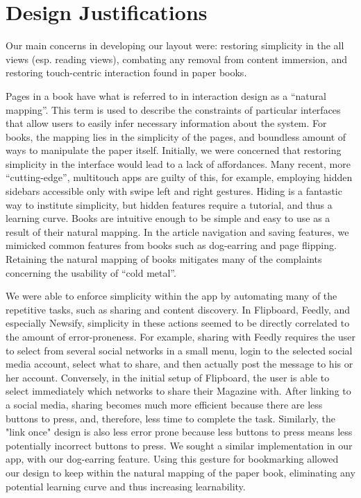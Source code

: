 \documentclass[11pt, oneside]{article}   	%
\begin{document}
\section{Design Justifications}
Our main concerns in developing our layout were: restoring simplicity in the all views (esp. reading views), combating any removal from content immersion, and restoring touch-centric interaction found in paper books.

Pages in a book have what is referred to in interaction design as a ``natural mapping''. This term is used to describe the constraints of particular interfaces that allow users to easily infer necessary information about the system. For books, the mapping lies in the simplicity of the pages, and boundless amount of ways to manipulate the paper itself. Initially, we were concerned that restoring simplicity in the interface would lead to a lack of affordances. Many recent, more ``cutting-edge'', multitouch apps are guilty of this, for example, employing hidden sidebars accessible only with swipe left and right gestures. Hiding is a fantastic way to institute simplicity, but hidden features require a tutorial, and thus a learning curve. Books are intuitive enough to be simple and easy to use as a result of their natural mapping. In the article navigation and saving features, we mimicked common features from books such as dog-earring and page flipping. Retaining the natural mapping of books mitigates many of the complaints concerning the usability of ``cold metal''.

We were able to enforce simplicity within the app by automating many of the repetitive tasks, such as sharing and content discovery. In Flipboard, Feedly, and especially Newsify, simplicity in these actions seemed to be directly correlated to the amount of error-proneness. For example, sharing with Feedly requires the user to select from several social networks in a small menu, login to the selected social media account, select what to share, and then actually post the message to his or her account. Conversely, in the initial setup of Flipboard, the user is able to select immediately which networks to share their Magazine with. After linking to a social media, sharing becomes much more efficient because there are less buttons to press, and, therefore, less time to complete the task. Similarly, the "link once" design is also less error prone because less buttons to press means less potentially incorrect buttons to press. We sought a similar implementation in our app, with our dog-earring feature. Using this gesture for bookmarking allowed our design to keep within the natural mapping of the paper book, eliminating any potential learning curve and thus increasing learnability.
\end{document}
